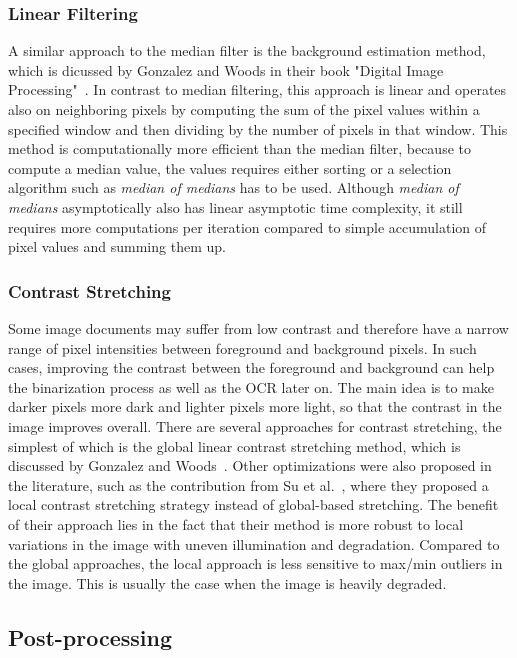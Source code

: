 \subsubsection{Linear Filtering}

A similar approach to the median filter is the background estimation method, which is dicussed by Gonzalez and Woods in their book "Digital Image Processing"~\cite{gonzalez2008digital}. In contrast to median filtering, this approach is linear and operates also on neighboring pixels by computing the sum of the pixel values within a specified window and then dividing by the number of pixels in that window. This method is computationally more efficient than the median filter, because to compute a median value, the values requires either sorting or a selection algorithm such as \textit{median of medians} has to be used. Although \textit{median of medians} asymptotically also has linear asymptotic time complexity, it still requires more computations per iteration compared to simple accumulation of pixel values and summing them up. 

\subsubsection{Contrast Stretching}

Some image documents may suffer from low contrast and therefore have a narrow range of pixel intensities between foreground and background pixels. In such cases, improving the contrast between the foreground and background can help the binarization process as well as the OCR later on. The main idea is to make darker pixels more dark and lighter pixels more light, so that the contrast in the image improves overall. There are several approaches for contrast stretching, the simplest of which is the global linear contrast stretching method, which is discussed by Gonzalez and Woods~\cite{gonzalez2008digital}. Other optimizations were also proposed in the literature, such as the contribution from Su et al.~\cite{6373726}, where they proposed a local contrast stretching strategy instead of global-based stretching. The benefit of their approach lies in the fact that their method is more robust to local variations in the image with uneven illumination and degradation. Compared to the global approaches, the local approach is less sensitive to max/min outliers in the image. This is usually the case when the image is heavily degraded.

\subsection{Post-processing}

